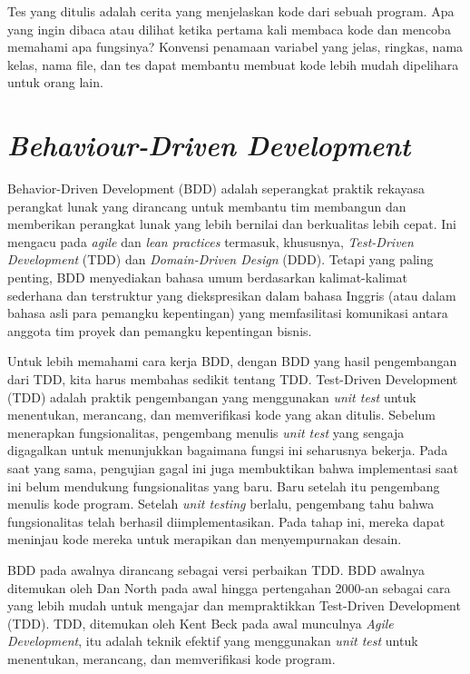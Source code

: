 \documentclass[a4paper,twoside]{article}
\begin{document}
\begin{enumerate}
Tes yang ditulis adalah cerita yang menjelaskan kode dari sebuah program. Apa yang ingin dibaca atau dilihat ketika pertama kali membaca kode dan mencoba memahami apa fungsinya? Konvensi penamaan variabel yang jelas, ringkas, nama kelas, nama file, dan tes dapat membantu membuat kode lebih  mudah dipelihara untuk orang lain.

\section*{\textit{Behaviour-Driven Development}}
Behavior-Driven Development (BDD) adalah seperangkat praktik rekayasa perangkat lunak yang dirancang untuk membantu tim membangun dan memberikan perangkat lunak yang lebih bernilai dan berkualitas lebih cepat. Ini mengacu pada \textit{agile} dan \textit{lean practices} termasuk, khususnya, \textit{Test-Driven Development} (TDD) dan \textit{Domain-Driven Design} (DDD). Tetapi yang paling penting, BDD menyediakan bahasa umum berdasarkan kalimat-kalimat sederhana dan terstruktur yang diekspresikan dalam bahasa Inggris (atau dalam bahasa asli para pemangku kepentingan) yang memfasilitasi komunikasi antara anggota tim proyek dan pemangku kepentingan bisnis.

Untuk lebih memahami cara kerja BDD, dengan BDD yang hasil pengembangan dari TDD, kita harus membahas sedikit tentang TDD. Test-Driven Development (TDD) adalah praktik pengembangan yang menggunakan \textit{unit test} untuk menentukan, merancang, dan memverifikasi kode yang akan ditulis. Sebelum menerapkan fungsionalitas, pengembang menulis \textit{unit test} yang sengaja digagalkan untuk menunjukkan bagaimana fungsi ini seharusnya bekerja. Pada saat yang sama, pengujian gagal ini juga membuktikan bahwa implementasi saat ini belum mendukung fungsionalitas yang baru. Baru setelah itu pengembang menulis kode program. Setelah \textit{unit testing} berlalu, pengembang tahu bahwa fungsionalitas telah berhasil diimplementasikan. Pada tahap ini, mereka dapat meninjau kode mereka untuk merapikan dan menyempurnakan desain.

BDD pada awalnya dirancang sebagai versi perbaikan TDD. BDD awalnya ditemukan oleh Dan North pada awal hingga pertengahan 2000-an sebagai cara yang lebih mudah untuk mengajar dan mempraktikkan Test-Driven Development (TDD). TDD, ditemukan oleh Kent Beck pada awal munculnya \textit{Agile Development}, itu adalah teknik efektif yang menggunakan \textit{unit test} untuk menentukan, merancang, dan memverifikasi kode program.


\end{enumerate}
\end{document}
